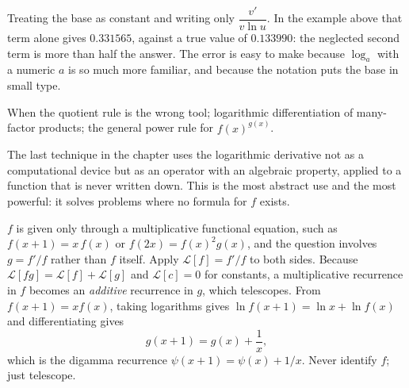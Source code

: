 \begin{trap}
Treating the base as constant and writing only $\dfrac{v'}{v\ln u}$. In the example above that term alone gives $0.331565$, against a true value of $0.133990$: the neglected second term is more than half the answer. The error is easy to make because $\log_{a}$ with a numeric $a$ is so much more familiar, and because the notation puts the base in small type.
\end{trap}

\begin{seealsob}When the quotient rule is the wrong tool; logarithmic differentiation of many-factor products; the general power rule for $f(x)^{g(x)}$.\end{seealsob}

The last technique in the chapter uses the logarithmic derivative not as a computational device but as an operator with an algebraic property, applied to a function that is never written down. This is the most abstract use and the most powerful: it solves problems where no formula for $f$ exists.

\cue $f$ is given only through a multiplicative functional equation, such as $f(x+1)=x\,f(x)$ or $f(2x)=f(x)^{2}g(x)$, and the question involves $g=f'/f$ rather than $f$ itself.
\method Apply $\mathcal{L}[f]=f'/f$ to both sides. Because $\mathcal{L}[fg]=\mathcal{L}[f]+\mathcal{L}[g]$ and $\mathcal{L}[c]=0$ for constants, a multiplicative recurrence in $f$ becomes an \emph{additive} recurrence in $g$, which telescopes. From $f(x+1)=x f(x)$, taking logarithms gives $\ln f(x+1)=\ln x+\ln f(x)$ and differentiating gives
\[
g(x+1)=g(x)+\frac1x ,
\]
which is the digamma recurrence $\psi(x+1)=\psi(x)+1/x$. Never identify $f$; just telescope.

